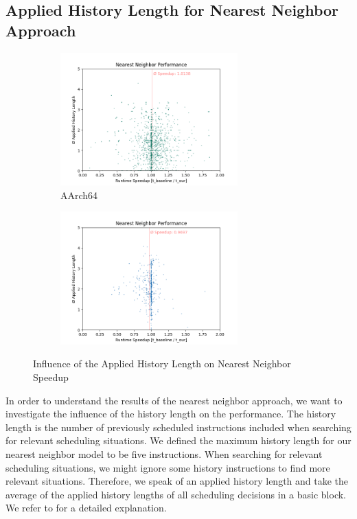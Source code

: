 \subsection{Applied History Length for Nearest Neighbor Approach}
\begin{figure}
    \begin{subfigure}{\textwidth}
        \centering
        \includegraphics[width=0.75\textwidth]{img/nearest-neighbor/rpi_nn_scatter_no_outliers.png}
        \caption{AArch64}
        \label{fig:eval:nn-hist:pi}
    \end{subfigure}
    \vfill
    \begin{subfigure}{\textwidth}
        \centering
        \includegraphics[width=0.75\textwidth]{img/nearest-neighbor/aurora_nn_scatter_no_outliers.png}
        \caption{\aurora}
        \label{fig:eval:nn-hist:aurora}
    \end{subfigure}
    \caption{Influence of the Applied History Length on Nearest Neighbor Speedup}
    \label{fig:eval:nn-hist}
\end{figure}
In order to understand the results of the nearest neighbor approach, we want to investigate the influence of the history length on the performance.
The history length is the number of previously scheduled instructions included when searching for relevant scheduling situations.
We defined the maximum history length for our nearest neighbor model to be five instructions.
When searching for relevant scheduling situations, we might ignore some history instructions to find more relevant situations.
Therefore, we speak of an applied history length and take the average of the applied history lengths of all scheduling decisions in a basic block.
We refer to  for a detailed explanation.

